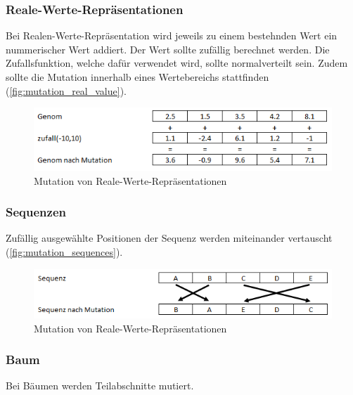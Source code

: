       \subsubsection{Reale-Werte-Repräsentationen}

        Bei Realen-Werte-Repräsentation wird jeweils zu einem bestehnden Wert ein nummerischer Wert addiert.
        Der Wert sollte zufällig berechnet werden.
        Die Zufallsfunktion, welche dafür verwendet wird, sollte normalverteilt sein.
        Zudem sollte die Mutation innerhalb eines Wertebereichs stattfinden (\vref{fig:mutation_real_value}).

        \begin{figure}[H]
          \includegraphics[scale=1, center]{graphics/mutation_real_value}
          \caption{Mutation von Reale-Werte-Repräsentationen\label{fig:mutation_real_value}}
        \end{figure}

      \subsubsection{Sequenzen}

        Zufällig ausgewählte Positionen der Sequenz werden miteinander vertauscht (\vref{fig:mutation_sequences}).

        \begin{figure}[H]
            \includegraphics[scale=1, center]{graphics/mutation_sequences}
            \caption{Mutation von Reale-Werte-Repräsentationen\label{fig:mutation_sequences}}
        \end{figure}

      \subsubsection{Baum}

        Bei Bäumen werden Teilabschnitte mutiert.

